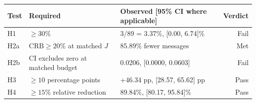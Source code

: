 \begin{tabular}{@{}lllr@{}}
\toprule
Test & Required & Observed [95\% CI where applicable] & Verdict \\
\midrule
H1 & $\geq 30\%$ & 3/89 = 3.37\%, [0.00, 6.74]\% & Fail \\
H2a & $\mathrm{CRB}\geq 20\%$ at matched $J$ & 85.89\% fewer messages & Met \\
H2b & CI excludes zero at matched budget & 0.0206, [0.0000, 0.0603] & Fail \\
H3 & $\geq 10$ percentage points & +46.34 pp, [28.57, 65.62] pp & Pass \\
H4 & $\geq 15\%$ relative reduction & 89.84\%, [80.17, 95.84]\% & Pass \\
\bottomrule
\end{tabular}
